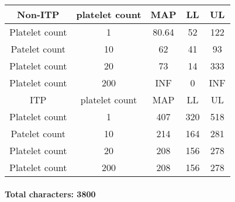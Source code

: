 \documentclass[11pt]{article}
\begin{document}
\begin{center}
 \begin{tabular}{||c c c c c||}
 \hline
 Non-ITP   & platelet count & MAP & LL & UL \\ [0.5ex]
 \hline\hline
 Platelet count & 1 & 80.64 & 52 & 122 \\
 \hline
 Patelet count & 10 & 62 & 41 & 93 \\
 \hline
 Platelet count & 20 & 73 & 14  & 333 \\
 \hline
 Platelet count & 200 & INF & 0 & INF \\
 \hline\hline
  ITP   & platelet count & MAP & LL & UL    \\
\hline\hline
 Platelet count & 1 & 407 & 320  & 518 \\
 \hline
 Patelet count & 10 & 214 & 164 & 281 \\
 \hline
 Platelet count & 20 & 208 & 156 & 278 \\
 \hline
 Platelet count & 200 & 208 & 156 & 278 \\ [1ex]
 \hline
\end{tabular}
\end{center}


\paragraph{}
\textbf{Total characters: 3800}
\end{document}
